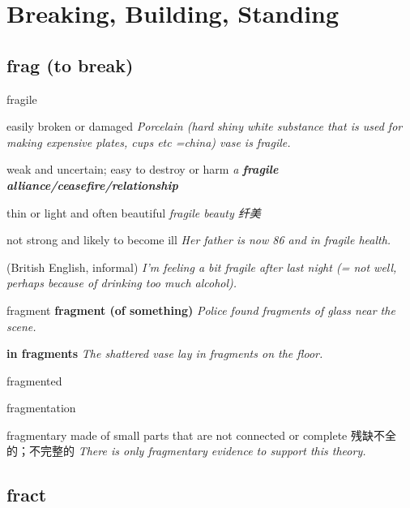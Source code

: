 \chapter{Breaking, Building, Standing}

\section{frag (to break)}

\begin{DefWord}{fragile}

    easily broken or damaged
    \textit{Porcelain (hard shiny white substance that is used for making expensive plates, cups etc =china) vase is fragile.}

    weak and uncertain; easy to destroy or harm
    \textit{a \textbf{fragile alliance/ceasefire/relationship}}

    thin or light and often beautiful
    \textit{fragile beauty 纤美}

    not strong and likely to become ill
    \textit{Her father is now 86 and in fragile health.}

    (British English, informal) \textit{I'm feeling a bit fragile after last night (= not well, perhaps because of drinking too much alcohol).}
\end{DefWord}

\begin{DefWord}{fragment}
    \textbf{fragment (of something)} \textit{Police found fragments of glass near the scene.}

    \textbf{in fragments} \textit{The shattered vase lay in fragments on the floor.}
\end{DefWord}


\begin{DefWord}{fragmented}
\end{DefWord}

\begin{DefWord}{fragmentation}
\end{DefWord}


\begin{DefWord}{fragmentary}
    made of small parts that are not connected or complete 残缺不全的；不完整的
    \textit{There is only fragmentary evidence to support this theory.}
\end{DefWord}




\section{fract}


